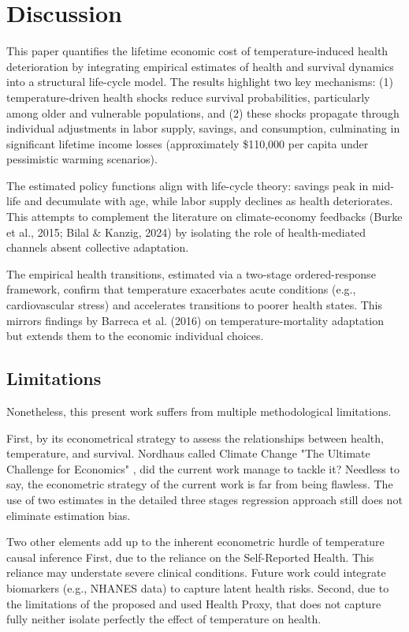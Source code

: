 \documentclass{article}
\begin{document}
\section{Discussion}

This paper quantifies the lifetime economic cost of temperature-induced health deterioration by integrating empirical estimates of health and survival dynamics into a structural life-cycle model. The results highlight two key mechanisms: (1) temperature-driven health shocks reduce survival probabilities, particularly among older and vulnerable populations, and (2) these shocks propagate through individual adjustments in labor supply, savings, and consumption, culminating in significant lifetime income losses (approximately \$110,000 per capita under pessimistic warming scenarios).

The estimated policy functions align with life-cycle theory: savings peak in mid-life and decumulate with age, while labor supply declines as health deteriorates.
This attempts to complement the literature on climate-economy feedbacks (Burke et al., 2015; Bilal \& Kanzig, 2024) by isolating the role of health-mediated channels absent collective adaptation.

The empirical health transitions, estimated via a two-stage ordered-response framework, confirm that temperature exacerbates acute conditions (e.g., cardiovascular stress) and accelerates transitions to poorer health states.
This mirrors findings by Barreca et al. (2016) on temperature-mortality adaptation but extends them to the economic individual choices.

\subsection{Limitations}

Nonetheless, this present work suffers from multiple methodological limitations.

First, by its econometrical strategy to assess the relationships between health, temperature, and survival.
Nordhaus called Climate Change "The Ultimate Challenge for Economics" \citep{Nordhaus_2019}, did the current work manage to tackle it? 
Needless to say, the econometric strategy of the current work is far from being flawless.
The use of two estimates in the detailed three stages regression approach still does not eliminate estimation bias.

Two other elements add up to the inherent econometric hurdle of temperature causal inference 
First, due to the reliance on the Self-Reported Health.
This reliance may understate severe clinical conditions.
Future work could integrate biomarkers (e.g., NHANES data) to capture latent health risks.
Second, due to the limitations of the proposed and used Health Proxy,
that does not capture fully neither isolate perfectly the effect of temperature on health.
\end{document}
